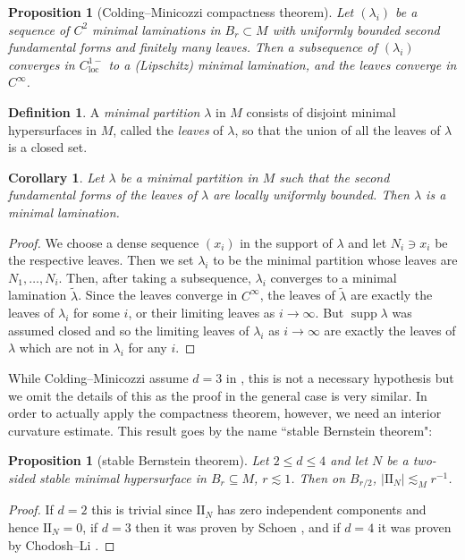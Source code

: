 \documentclass[reqno,10pt]{amsart}
\DeclareMathOperator{\supp}{supp}
\newcommand{\Two}{\mathrm{I\!I}}
\newcommand{\dfn}[1]{\emph{#1}\index{#1}}
\newcommand{\loc}{\mathrm{loc}}
\newtheorem{proposition}[theorem]{Proposition}
\newtheorem{corollary}[theorem]{Corollary}
\theoremstyle{definition}
\newtheorem{definition}[theorem]{Definition}
\numberwithin{equation}{section}
\begin{document}
\begin{proposition}[Colding--Minicozzi compactness theorem]
Let $(\lambda_i)$ be a sequence of $C^2$ minimal laminations in $B_r \subset M$ with uniformly bounded second fundamental forms and finitely many leaves.
Then a subsequence of $(\lambda_i)$ converges in $C^{1-}_\loc$ to a (Lipschitz) minimal lamination, and the leaves converge in $C^\infty$.
\end{proposition}

\begin{definition}
A \dfn{minimal partition} $\lambda$ in $M$ consists of disjoint minimal hypersurfaces in $M$, called the \dfn{leaves} of $\lambda$, so that the union of all the leaves of $\lambda$ is a closed set.
\end{definition}

\begin{corollary}\label{construction of minimal laminations}
Let $\lambda$ be a minimal partition in $M$ such that the second fundamental forms of the leaves of $\lambda$ are locally uniformly bounded.
Then $\lambda$ is a minimal lamination.
\end{corollary}
\begin{proof}
We choose a dense sequence $(x_i)$ in the support of $\lambda$ and let $N_i \ni x_i$ be the respective leaves.
Then we set $\lambda_i$ to be the minimal partition whose leaves are $N_1, \dots, N_i$.
Then, after taking a subsequence, $\lambda_i$ converges to a minimal lamination $\tilde \lambda$.
Since the leaves converge in $C^\infty$, the leaves of $\tilde \lambda$ are exactly the leaves of $\lambda_i$ for some $i$, or their limiting leaves as $i \to \infty$.
But $\supp \lambda$ was assumed closed and so the limiting leaves of $\lambda_i$ as $i \to \infty$ are exactly the leaves of $\lambda$ which are not in $\lambda_i$ for any $i$.
\end{proof}

While Colding--Minicozzi assume $d = 3$ in \cite{ColdingMinicozziIV}, this is not a necessary hypothesis but we omit the details of this as the proof in the general case is very similar.
In order to actually apply the compactness theorem, however, we need an interior curvature estimate.
This result goes by the name ``stable Bernstein theorem":

\begin{proposition}[stable Bernstein theorem]
Let $2 \leq d \leq 4$ and let $N$ be a two-sided stable minimal hypersurface in $B_r \subseteq M$, $r \lesssim 1$.
Then on $B_{r/2}$, $|\Two_N| \lesssim_M r^{-1}$.
\end{proposition}
\begin{proof}
If $d = 2$ this is trivial since $\Two_N$ has zero independent components and hence $\Two_N = 0$, if $d = 3$ then it was proven by Schoen \cite[Corollary 2.11]{colding2011course}, and if $d = 4$ it was proven by Chodosh--Li \cite{Chodosh2021}.
\end{proof}
\end{document}
